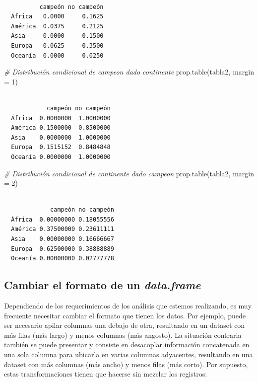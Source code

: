 \documentclass[
]{book}
\newenvironment{Shaded}{\begin{snugshade}}{\end{snugshade}}
\newcommand{\AttributeTok}[1]{\textcolor[rgb]{0.77,0.63,0.00}{#1}}
\newcommand{\CommentTok}[1]{\textcolor[rgb]{0.56,0.35,0.01}{\textit{#1}}}
\newcommand{\DecValTok}[1]{\textcolor[rgb]{0.00,0.00,0.81}{#1}}
\newcommand{\FunctionTok}[1]{\textcolor[rgb]{0.00,0.00,0.00}{#1}}
\newcommand{\NormalTok}[1]{#1}
\begin{document}
\begin{verbatim}
         
          campeón no campeón
  África   0.0000     0.1625
  América  0.0375     0.2125
  Asia     0.0000     0.1500
  Europa   0.0625     0.3500
  Oceanía  0.0000     0.0250
\end{verbatim}

\begin{Shaded}
\begin{Highlighting}[]
\CommentTok{\# Distribución condicional de campeon dado continente}
\FunctionTok{prop.table}\NormalTok{(tabla2, }\AttributeTok{margin =} \DecValTok{1}\NormalTok{)}
\end{Highlighting}
\end{Shaded}

\begin{verbatim}
         
            campeón no campeón
  África  0.0000000  1.0000000
  América 0.1500000  0.8500000
  Asia    0.0000000  1.0000000
  Europa  0.1515152  0.8484848
  Oceanía 0.0000000  1.0000000
\end{verbatim}

\begin{Shaded}
\begin{Highlighting}[]
\CommentTok{\# Distribución condicional de continente dado campeon}
\FunctionTok{prop.table}\NormalTok{(tabla2, }\AttributeTok{margin =} \DecValTok{2}\NormalTok{)}
\end{Highlighting}
\end{Shaded}

\begin{verbatim}
         
             campeón no campeón
  África  0.00000000 0.18055556
  América 0.37500000 0.23611111
  Asia    0.00000000 0.16666667
  Europa  0.62500000 0.38888889
  Oceanía 0.00000000 0.02777778
\end{verbatim}

\hypertarget{cambiar-el-formato-de-un-data.frame}{%
\subsection{\texorpdfstring{Cambiar el formato de un \emph{data.frame}}{Cambiar el formato de un data.frame}}\label{cambiar-el-formato-de-un-data.frame}}

Dependiendo de los requerimientos de los análisis que estemos realizando, es muy frecuente necesitar cambiar el formato que tienen los datos. Por ejemplo, puede ser necesario apilar columnas una debajo de otra, resultando en un dataset con más filas (más largo) y menos columnas (más angosto). La situación contraria también se puede presentar y consiste en desacoplar información concatenada en una sola columna para ubicarla en varias columnas adyacentes, resultando en una dataset con más columnas (más ancho) y menos filas (más corto). Por supuesto, estas transformaciones tienen que hacerse sin mezclar los registros:
\end{document}
